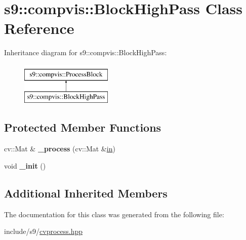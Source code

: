 \hypertarget{classs9_1_1compvis_1_1BlockHighPass}{\section{s9\-:\-:compvis\-:\-:Block\-High\-Pass Class Reference}
\label{classs9_1_1compvis_1_1BlockHighPass}
}
Inheritance diagram for s9\-:\-:compvis\-:\-:Block\-High\-Pass\-:\begin{figure}[H]
\begin{center}
\leavevmode
\includegraphics[height=2.000000cm]{classs9_1_1compvis_1_1BlockHighPass}
\end{center}
\end{figure}
\subsection*{Protected Member Functions}
\begin{DoxyCompactItemize}
\item 
\hypertarget{classs9_1_1compvis_1_1BlockHighPass_a1d1703a6b19b42712c5cb235a5d9acf1}{cv\-::\-Mat \& {\bfseries \-\_\-process} (cv\-::\-Mat \&\hyperlink{structin}{in})}\label{classs9_1_1compvis_1_1BlockHighPass_a1d1703a6b19b42712c5cb235a5d9acf1}

\item 
\hypertarget{classs9_1_1compvis_1_1BlockHighPass_a19b60ec4b79ced34b5b48c0e6b98809c}{void {\bfseries \-\_\-init} ()}\label{classs9_1_1compvis_1_1BlockHighPass_a19b60ec4b79ced34b5b48c0e6b98809c}

\end{DoxyCompactItemize}
\subsection*{Additional Inherited Members}


The documentation for this class was generated from the following file\-:\begin{DoxyCompactItemize}
\item 
include/s9/\hyperlink{cvprocess_8hpp}{cvprocess.\-hpp}\end{DoxyCompactItemize}
